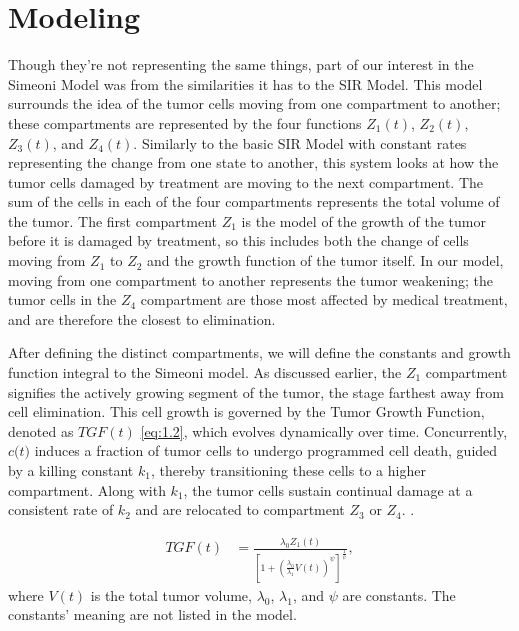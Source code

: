 \documentclass[11pt]{amsart}
\begin{document}
\section{Modeling}
Though they're not representing the same things, part of our interest in the Simeoni Model was from the similarities it has to the SIR Model. This model surrounds the idea of the tumor cells moving from one compartment to another; these compartments are represented by the four functions $Z_1(t)$, $Z_2(t)$, $Z_3(t)$, and $Z_4(t)$. Similarly to the basic SIR Model with constant rates representing the change from one state to another, this system looks at how the tumor cells damaged by treatment are moving to the next compartment. The sum of the cells in each of the four compartments represents the total volume of the tumor. The first compartment $Z_1$ is the model of the growth of the tumor before it is damaged by treatment, so this includes both the change of cells moving from $Z_1$ to $Z_2$ and the growth function of the tumor itself. In our model, moving from one compartment to another represents the tumor weakening; the tumor cells in the $Z_4$ compartment are those most affected by medical treatment, and are therefore the closest to elimination. 

After defining the distinct compartments, we will define the constants and growth function integral to the Simeoni model. As discussed earlier, the $Z_1$ compartment signifies the actively growing segment of the tumor, the stage farthest away from cell elimination. This cell growth is governed by the Tumor Growth Function, denoted as $TGF(t)$ \ref{eq:1.2}, which evolves dynamically over time. Concurrently, $c$$($$t$$)$ induces a fraction of tumor cells to undergo programmed cell death, guided by a killing constant 
$k_1$, thereby transitioning these cells to a higher compartment. Along with $k_1$,  the tumor cells sustain continual damage at a consistent rate of $k_2$ and are relocated to compartment $Z_3$ or $Z_4$. \cite{Koziol_Falls_Schnitzer_2020}.


\begin{equation} \label{eq:1.2}
\begin{aligned}
    TGF(t) &= \frac{\lambda_0Z_1(t)}{[1 + (\frac{\lambda_0}{\lambda_1}V(t))^\psi]^\frac{1}{\psi}}, 
\end{aligned}
\tag*{(1.2)}
\end{equation}
\qquad where $V(t)$ is the total tumor volume, $\lambda_0$, $\lambda_1$, and $\psi$ are constants. The constants' meaning are not listed in the model. 
\end{document}
